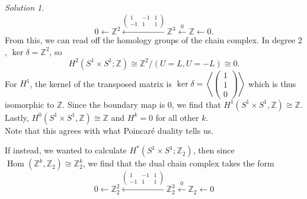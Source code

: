 \documentclass[reqno]{amsart}
\theoremstyle{definition}
\theoremstyle{remark}
\newtheorem*{solution}{Solution}
\DeclareMathOperator{\Hom}{Hom}
\begin{document}
\begin{solution}
         \[
         0 \leftarrow \mathbb{Z}^2 
         \stackrel{
         \begin{pmatrix} 
             1 & -1 & 1\\
             -1 & 1 & 1
     \end{pmatrix}}{\leftarrow}   \mathbb{Z}^3 
     \stackrel{0}{\leftarrow} \mathbb{Z} \leftarrow 0.
         \] 
         From this, we can read off the homology groups
         of the chain complex.
         In degree $2$, $\ker \delta = \mathbb{Z}^2$, so
         \[
         H^{2}(S^{1} \times S^{1}; \mathbb{Z})
         \cong
         \mathbb{Z}^2 / \left( U = L,
         U = -L \right) \cong
         0.
         \] 
         For $H^{1}$, the kernel
         of the transposed matrix
         is
         $\ker \delta  =
         \left< 
         \begin{pmatrix} 1 \\ 1 \\ 0 \end{pmatrix} \right>$ which
         is thus isomorphic to $\mathbb{Z}$. Since the
         boundary map is $0$, we find that
         $H^{1}\left( S^{1} \times S^{1},\mathbb{Z} \right) 
         \cong \mathbb{Z}$. Lastly,
         $H^{0}\left( S^{1} \times S^{1},\mathbb{Z} \right) 
         \cong \mathbb{Z}$ and
         $H^{k} = 0$ for all other $k$.\\
         Note that this agrees with what
         Poincaré duality tells us.\\
         \linebreak
         
         If instead, we wanted to calculate
         $H^{*}\left( S^{1} \times S^{1};
         \mathbb{Z}_2 \right) $, then
         since
         $\Hom \left( \mathbb{Z}^{k},
         \mathbb{Z}_2 \right) \cong 
         \mathbb{Z}_2^{k}$, we find that the dual chain
         complex takes the form
         \[
         0 \leftarrow \mathbb{Z}_2^2 
         \stackrel{
         \begin{pmatrix} 1 & -1 & 1\\
     -1 & 1 & 1 \end{pmatrix} }{\leftarrow} 
     \mathbb{Z}_2^3 \stackrel{0}{\leftarrow} 
     \mathbb{Z}_2 \leftarrow 0
         \] 


\end{solution}
\end{document}
